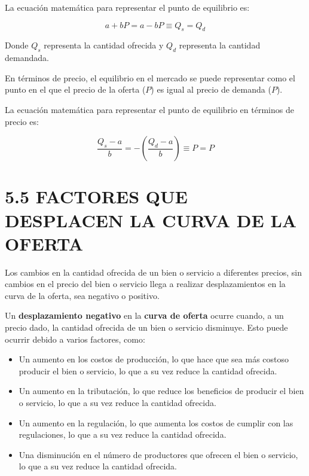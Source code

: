 \documentclass[
  spanish,
  12pt,
]{book}
\providecommand{\tightlist}{%
  \setlength{\itemsep}{0pt}\setlength{\parskip}{0pt}}
\begin{document}
La ecuación matemática para representar el punto de equilibrio es:

\begin{equation}
a + bP = a - bP \equiv Q_{s} = Q_{d}
\end{equation}

Donde \(Q_{s}\) representa la cantidad ofrecida y \(Q_{d}\) representa
la cantidad demandada.

En términos de precio, el equilibrio en el mercado se puede representar
como el punto en el que el precio de la oferta (\(P\)) es igual al
precio de demanda (\(P\)).

La ecuación matemática para representar el punto de equilibrio en
términos de precio es:

\begin{equation}
\frac{Q_{s}-a}{b}=-(\frac{Q_{d}-a}{b}) \equiv P = P
\end{equation}

\newpage

\section{5.5 FACTORES QUE DESPLACEN LA CURVA DE LA
OFERTA}\label{factores-que-desplacen-la-curva-de-la-oferta}

Los cambios en la cantidad ofrecida de un bien o servicio a diferentes
precios, sin cambios en el precio del bien o servicio llega a realizar
desplazamientos en la curva de la oferta, sea negativo o positivo.

Un \textbf{desplazamiento negativo} en la \textbf{curva de oferta}
ocurre cuando, a un precio dado, la cantidad ofrecida de un bien o
servicio disminuye. Esto puede ocurrir debido a varios factores, como:

\begin{itemize}
\tightlist
\item
  Un aumento en los costos de producción, lo que hace que sea más
  costoso producir el bien o servicio, lo que a su vez reduce la
  cantidad ofrecida.
\item
  Un aumento en la tributación, lo que reduce los beneficios de producir
  el bien o servicio, lo que a su vez reduce la cantidad ofrecida.
\item
  Un aumento en la regulación, lo que aumenta los costos de cumplir con
  las regulaciones, lo que a su vez reduce la cantidad ofrecida.
\item
  Una disminución en el número de productores que ofrecen el bien o
  servicio, lo que a su vez reduce la cantidad ofrecida.
\end{itemize}
\end{document}
